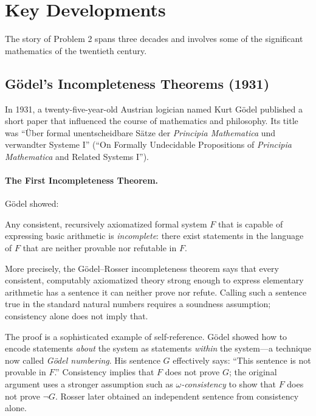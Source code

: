 \section{Key Developments}

The story of Problem 2 spans three decades and involves some of the significant mathematics of the twentieth century.

\subsection{G\"odel's Incompleteness Theorems (1931)}

In 1931, a twenty-five-year-old Austrian logician named Kurt G\"odel published a short paper that influenced the course of mathematics and philosophy. Its title was ``\"Uber formal unentscheidbare S\"atze der \emph{Principia Mathematica} und verwandter Systeme I'' (``On Formally Undecidable Propositions of \emph{Principia Mathematica} and Related Systems I'').

\paragraph{The First Incompleteness Theorem.}

G\"odel showed:

\begin{theorem}
\label{thm:godel-first}
Any consistent, recursively axiomatized formal system $F$ that is capable of expressing basic arithmetic is \emph{incomplete}: there exist statements in the language of $F$ that are neither provable nor refutable in $F$.
\end{theorem}

More precisely, the Gödel--Rosser incompleteness theorem says that every consistent, computably axiomatized theory strong enough to express elementary arithmetic has a sentence it can neither prove nor refute. Calling such a sentence true in the standard natural numbers requires a soundness assumption; consistency alone does not imply that.

The proof is a sophisticated example of self-reference. G\"odel showed how to encode statements \emph{about} the system as statements \emph{within} the system---a technique now called \emph{G\"odel numbering}. His sentence $G$ effectively says: ``This sentence is not provable in $F$.'' Consistency implies that $F$ does not prove $G$; the original argument uses a stronger assumption such as \emph{$\omega$-consistency} to show that $F$ does not prove $\neg G$. Rosser later obtained an independent sentence from consistency alone.

